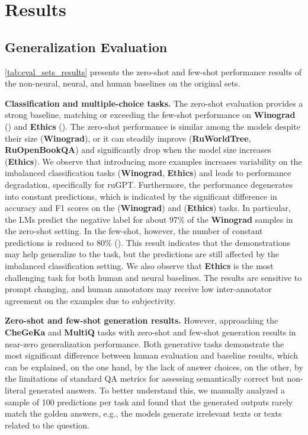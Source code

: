 \documentclass[11pt]{article}
\begin{document}
\section{Results}


\subsection{Generalization Evaluation} \label{sec:generalization}
\autoref{tab:eval_sets_results} presents the zero-shot and few-shot performance results of the non-neural, neural, and human baselines on the original  sets.


\vspace{0.1em} \noindent\textbf{Classification and multiple-choice tasks.} The zero-shot evaluation provides a strong baseline, matching or exceeding the few-shot performance on \textbf{Winograd} () and \textbf{Ethics} (). The zero-shot performance is similar among the models despite their size (\textbf{Winograd}), or it can steadily improve (\textbf{RuWorldTree}, \textbf{RuOpenBookQA}) and significantly drop when the model size increases (\textbf{Ethics}). We observe that introducing more examples increases variability on the imbalanced classification tasks (\textbf{Winograd}, \textbf{Ethics}) and leads to performance degradation, specifically for ruGPT. Furthermore, the performance degenerates into constant predictions, which is indicated by the significant difference in accuracy and F1 scores on the (\textbf{Winograd}) and (\textbf{Ethics}) tasks. In particular, the LMs predict the negative label for about 97\% of the \textbf{Winograd} samples in the zero-shot setting. In the few-shot, however, the number of constant predictions is reduced to 80\% (). This result indicates that the demonstrations may help generalize to the task, but the predictions are still affected by the imbalanced classification setting. We also observe that \textbf{Ethics} is the most challenging task for both human and neural baselines. The results are sensitive to prompt changing, and human annotators may receive low inter-annotator agreement on the examples due to subjectivity.

\vspace{0.1em}\noindent\textbf{Zero-shot and few-shot generation results.} 
However, approaching the  \textbf{CheGeKa} and \textbf{MultiQ} tasks with zero-shot and few-shot generation results in near-zero generalization performance. Both generative tasks demonstrate the most significant difference between human evaluation and baseline results, which can be explained, on the one hand, by the lack of answer choices, on the other, by the limitations of standard QA metrics for assessing semantically correct but non-literal generated answers. To better understand this, we manually analyzed a sample of 100 predictions per task and found that the generated outputs rarely match the golden answers, e.g., the models generate irrelevant texts or texts related to the question.
\end{document}
